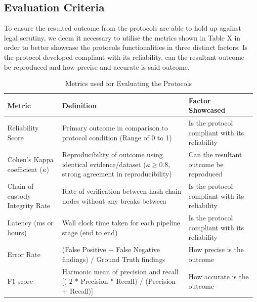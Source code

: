 \documentclass[a4paper]{report}
\begin{document}
\begin{justify}
\section{Evaluation Criteria}

To ensure the resulted outcome from the protocols are able to hold up against legal scrutiny, we deem it necessary to utilise the metrics shown in Table X in order to better showcase the protocols functionalities in three distinct factors: Is the protocol developed compliant with its reliability, can the resultant outcome be reproduced and how precise and accurate is said outcome.

\begin{table}[H]
\caption{Metrics used for Evaluating the Protocols}
\label{tab:inclusion-exclusion}

\fontsize{10pt}{12pt}\selectfont

\begin{tabular}{|p{4cm}|p{5cm}|p{5cm}|}
\hline
\centering\textbf{Metric} &
\centering\textbf{Definition} &
\centering\textbf{Factor Showcased}
\tabularnewline
\hline

\centering Reliability Score &
\centering Primary outcome in comparison to protocol condition (Range of 0 to 1) &
\centering Is the protocol compliant with its reliability
\tabularnewline
\hline

\centering Cohen’s Kappa coefficient ($\kappa$) &
\centering Reproducibility of outcome using identical evidence/dataset ($\kappa \geq 0.8$, strong agreement in reproducibility) &
\centering Can the resultant outcome be reproduced
\tabularnewline
\hline

\centering Chain of custody Integrity Rate &
\centering Rate of verification between hash chain nodes without any breaks between &
\centering Is the protocol compliant with its reliability
\tabularnewline
\hline

\centering Latency (ms or hours) &
\centering Wall clock time taken for each pipeline stage (end to end) &
\centering Is the protocol compliant with its reliability
\tabularnewline
\hline

\centering Error Rate &
\centering (False Positive + False Negative findings) / Ground Truth findings &
\centering How precise is the outcome
\tabularnewline
\hline

\centering F1 score &
\centering Harmonic mean of precision and recall [( 2 * Precision * Recall) / (Precision + Recall)] &
\centering How accurate is the outcome
\tabularnewline
\hline


\end{tabular}
\end{table}
\end{justify}
\end{document}
